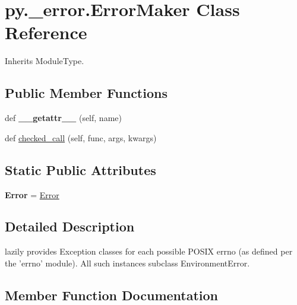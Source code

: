 \hypertarget{classpy_1_1__error_1_1_error_maker}{}\section{py.\+\_\+error.\+Error\+Maker Class Reference}
\label{classpy_1_1__error_1_1_error_maker}


Inherits Module\+Type.

\subsection*{Public Member Functions}
\begin{DoxyCompactItemize}
\item 
\mbox{\label{classpy_1_1__error_1_1_error_maker_a79f27f3d2a3b71739890aaf1b7504512}} 
def {\bfseries \+\_\+\+\_\+getattr\+\_\+\+\_\+} (self, name)
\item 
def \hyperlink{classpy_1_1__error_1_1_error_maker_a617e6bde33794170f543997999a367ee}{checked\+\_\+call} (self, func, args, kwargs)
\end{DoxyCompactItemize}
\subsection*{Static Public Attributes}
\begin{DoxyCompactItemize}
\item 
\mbox{\label{classpy_1_1__error_1_1_error_maker_a172212ec57e96bb694bf7abebd4191da}} 
{\bfseries Error} = \hyperlink{classpy_1_1__error_1_1_error}{Error}
\end{DoxyCompactItemize}


\subsection{Detailed Description}
\begin{DoxyVerb}lazily provides Exception classes for each possible POSIX errno
    (as defined per the 'errno' module).  All such instances
    subclass EnvironmentError.
\end{DoxyVerb}
 

\subsection{Member Function Documentation}
\mbox{\label{classpy_1_1__error_1_1_error_maker_a617e6bde33794170f543997999a367ee}} 
